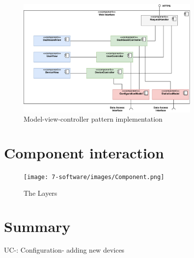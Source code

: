 \begin{figure}[H]
	\centering
	\includegraphics[width=0.8\textwidth]{7-software/images/mvc.pdf}
	\caption{Model-view-controller pattern implementation}
	\label{fig:mvc-architecture}
\end{figure}

\section{Component interaction}

\begin{figure}[H]
\centering
\texttt{[image: 7-software/images/Component.png]}
\caption{The Layers}
\label{fig:layers}
\end{figure}




\section{Summary}

\begin{table}[H]
\caption{UC-: Configuration- adding new devices}
\label{table:patternchallenges}
\end{table}

%
%
%

